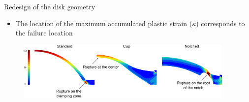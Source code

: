 \documentclass[9pt]{beamer}
\begin{document}

\begin{frame}{Redesign of the disk geometry}

\begin{itemize}
	\item The location of the maximum accumulated plastic strain ($\kappa$) corresponds to the failure location
\end{itemize}

\vspace{0.5cm}

\begin{figure}
	\centering
	\includegraphics[width=0.95\textwidth]{Images/disks_rupture.pdf}
\end{figure}

\end{frame}

\end{document}
